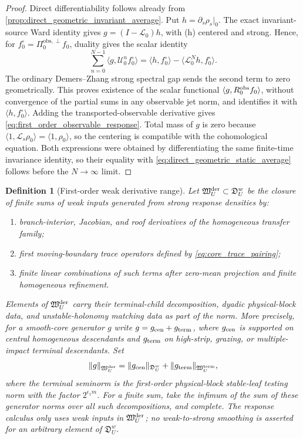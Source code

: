 \documentclass[11pt]{amsart}
\theoremstyle{compactplain}
\theoremstyle{compactdefinition}
\newtheorem{definition}[theorem]{Definition}
\theoremstyle{compactremark}
\newcommand{\Ltransfer}{\mathscr L}
\newcommand{\Piobsperp}{\Pi^{\mathrm{obs},\perp}}
\begin{document}
\begin{proof}
Direct differentiability follows already from
\cref{prop:direct_geometric_invariant_average}.  Put
\(h=\partial_s\rho_s|_0\).  The exact invariant-source Ward identity gives
\(g=(I-\Ltransfer_0)h\), with (h) centered and strong.  Hence, for
\(f_0^\circ=\Piobsperp_0f_0\), duality gives the scalar identity
\[
 \sum_{n=0}^{N-1}\langle g,\mathscr U_0^nf_0^\circ\rangle
 =\langle h,f_0^\circ\rangle-\langle\Ltransfer_0^Nh,f_0^\circ\rangle .
\]
The ordinary Demers--Zhang strong spectral gap sends the second term to zero
geometrically.  This proves existence of the scalar functional
\(\langle g,R_0^{\rm obs}f_0\rangle\), without convergence of the partial sums
in any observable jet norm, and identifies it with
\(\langle h,f_0^\circ\rangle\).  Adding the transported-observable derivative
gives \eqref{eq:first_order_observable_response}.  Total mass of \(g\) is zero because
\(\langle1,\Ltransfer_s\rho_0\rangle=\langle1,\rho_0\rangle\), so the centering
is compatible with the cohomological equation.  Both expressions were obtained
by differentiating the same finite-time invariance identity, so their equality
with \eqref{eq:direct_geometric_static_average} follows before the
\(N\to\infty\) limit.
\end{proof}

\begin{definition}[First-order weak derivative range]
\label{def:first_order_weak_derivative_range}
Let \(\mathfrak W_U^{\rm der}\subset\mathfrak D_U^w\) be the closure of finite
sums of weak inputs generated from strong response densities by:
\begin{enumerate}[label=\textup{(\roman*)},wide,labelindent=0pt]
  \item branch-interior, Jacobian, and roof derivatives of the homogeneous
  transfer family;
  \item first moving-boundary trace operators defined by
  \eqref{eq:core_trace_pairing};
  \item finite linear combinations of such terms after zero-mean projection and
  finite homogeneous refinement.
\end{enumerate}
Elements of \(\mathfrak W_U^{\rm der}\) carry their terminal-child
decomposition, dyadic physical-block data, and unstable-holonomy matching data as part of
the norm.  More precisely, for a smooth-core generator \(g\) write
\(g=g_{\rm cen}+g_{\rm term}\), where \(g_{\rm cen}\) is supported on central
homogeneous descendants and \(g_{\rm term}\) on high-strip, grazing, or
multiple-impact terminal descendants.  Set
\[
  \|g\|_{\mathfrak W_U^{\rm der}}
  =
  \|g_{\rm cen}\|_{\mathfrak D_U^w}
  +\|g_{\rm term}\|_{\mathfrak W_U^{\rm term}},
\]
where the terminal seminorm is the first-order physical-block stable-leaf
testing norm with the factor \(2^{\epsilon_1m}\).  For a finite sum, take the infimum of
the sum of these generator norms over all such decompositions, and complete.
The response calculus only uses weak inputs in \(\mathfrak W_U^{\rm der}\); no
weak-to-strong smoothing is asserted for an arbitrary element of
\(\mathfrak D_U^w\).
\end{definition}
\end{document}
